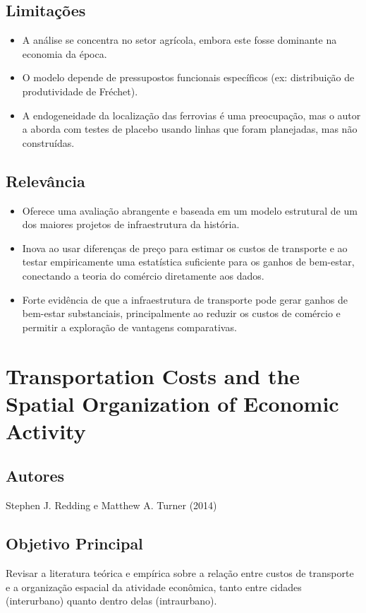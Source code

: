 \documentclass[12pt]{article}
\begin{document}
\subsection*{Limitações}
\begin{itemize}
    \item A análise se concentra no setor agrícola, embora este fosse dominante na economia da época.
    \item O modelo depende de pressupostos funcionais específicos (ex: distribuição de produtividade de Fréchet).
    \item A endogeneidade da localização das ferrovias é uma preocupação, mas o autor a aborda com testes de placebo usando linhas que foram planejadas, mas não construídas.
\end{itemize}

\subsection*{Relevância}
\begin{itemize}
    \item Oferece uma avaliação abrangente e baseada em um modelo estrutural de um dos maiores projetos de infraestrutura da história.
    \item Inova ao usar diferenças de preço para estimar os custos de transporte e ao testar empiricamente uma estatística suficiente para os ganhos de bem-estar, conectando a teoria do comércio diretamente aos dados.
    \item Forte evidência de que a infraestrutura de transporte pode gerar ganhos de bem-estar substanciais, principalmente ao reduzir os custos de comércio e permitir a exploração de vantagens comparativas.
\end{itemize}
\newpage

\section{Transportation Costs and the Spatial Organization of Economic Activity}

\subsection*{Autores}
Stephen J. Redding e Matthew A. Turner (2014)

\subsection*{Objetivo Principal}
Revisar a literatura teórica e empírica sobre a relação entre custos de transporte e a organização espacial da atividade econômica, tanto entre cidades (interurbano) quanto dentro delas (intraurbano).
\end{document}
